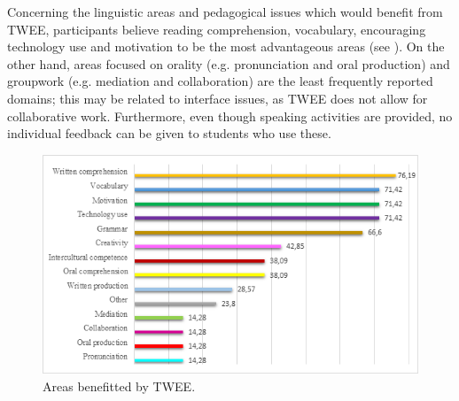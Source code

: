 Concerning the linguistic areas and pedagogical issues which would
benefit from TWEE, participants believe reading comprehension,
vocabulary, encouraging technology use and motivation to be the most
advantageous areas (see ). On the other hand, areas focused on
orality (e.g. pronunciation and oral production) and groupwork (e.g.
mediation and collaboration) are the least frequently reported domains;
this may be related to interface issues, as TWEE does not allow for
collaborative work. Furthermore, even though speaking activities are
provided, no individual feedback can be given to students who use these.

\begin{figure}
    \centering
    \caption{Areas benefitted by TWEE.}
    \label{img-02}
    \includegraphics[width=0.9\linewidth]{image2.png}
\end{figure}

